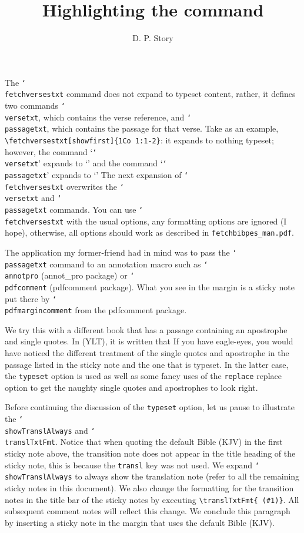 \documentclass{article}
\title{Highlighting the \texorpdfstring{\protect
  \cs{fetchversestxt}}{\textbackslash{fetchversestxt}} command}
\author{D. P. Story}
\def\cs#1{\texttt{\char`\\#1}}
\let\pkg\textsf
\begin{document}
\maketitle

The \cs{fetchversestxt} command does not expand to typeset content, rather,
it defines two commands \cs{versetxt}, which contains the verse reference,
and \cs{passagetxt}, which contains the passage for that verse. Take as an
example, \verb~\fetchversestxt[showfirst]{1Co 1:1-2}~:
it expands to nothing typeset; however, the command `\cs{versetxt}' expands
to `\versetxt' and the command `\cs{passagetxt}' expands to `\passagetxt' The
next expansion of \cs{fetchversestxt} overwrites the \cs{versetxt} and
\cs{passagetxt} commands. You can use \cs{fetchversestxt} with the usual
options, any formatting options are ignored (I hope), otherwise, all options
should work as described in \texttt{fetchbibpes\_man.pdf}.

The application\pdfmargincomment[author={\versetxt}]{\passagetxt}
my former-friend had in mind was to pass the \cs{passagetxt} command to an
annotation macro such as \cs{annotpro} (\pkg{annot\_pro} package) or
\cs{pdfcomment} (\pkg{pdfcomment} package). What you see in the margin is a
sticky note put there by  \cs{pdfmargincomment} from the \pkg{pdfcomment}
package.

We try this with a different book that has a passage containing an apostrophe
and single quotes.\pdfmargincomment[author={\versetxt}]{\passagetxt}
In\eSQ{}
\versetxt\space(YLT), it is written that \textsl{\passagetxt} If you have
eagle-eyes, you would have noticed the different treatment of the single
quotes and apostrophe in the passage listed in the sticky note and the one
that is typeset. In the latter case, the \texttt{typeset} option is used as
well as some fancy uses of the \texttt{replace} replace option to get the
naughty single quotes and apostrophes to look right.

\showTranslAlways
{}

Before\pdfmargincomment[author={\versetxt}]{\passagetxt} continuing the discussion of the \texttt{typeset} option, let us pause
to illustrate the \cs{showTranslAlways} and \cs{translTxtFmt}. Notice that
when quoting the default Bible (KJV) in the first sticky note above, the
transition note does not appear in the title heading of the sticky note, this
is because the \texttt{transl} key was not used. We expand
\cs{showTranslAlways} to always show the translation note (refer to all the
remaining sticky notes in this document). We also change the formatting for the transition notes
in the title bar of the sticky notes by executing \verb|\translTxtFmt{ (#1)}|. All subsequent comment notes
will reflect this change. We conclude this paragraph by inserting a sticky note in the margin that uses the default Bible (KJV).
\end{document}
